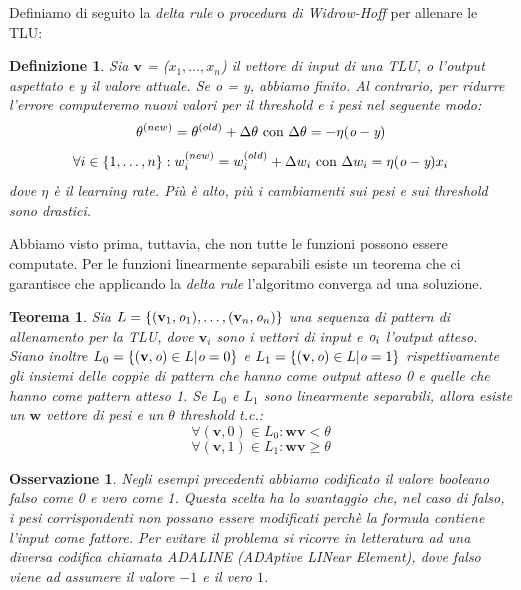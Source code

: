 \documentclass[10pt,a4paper]{article}
\newtheorem{remark}{Osservazione}
\newtheorem{definition}{Definizione}
\newtheorem{theorem}{Teorema}
\newcommand{\ww}{\mathbf{w}}
\newcommand{\vv}{\mathbf{v}}
\begin{document}
Definiamo di seguito la \emph{delta rule} o \emph{procedura di Widrow-Hoff} per allenare le TLU:

\begin{definition}
Sia $\vv$ = ($x_1, \dots, x_n$) il vettore di input di una TLU, \emph{o} l'output aspettato e \emph{y} il valore attuale. Se \emph{o} = \emph{y}, abbiamo finito. Al contrario, per ridurre l'errore computeremo nuovi valori per il threshold e i pesi nel seguente modo:
$$
\theta^{(new)} = \theta^{(old)} + \Delta\theta \text{ con } \Delta\theta = -\eta(\emph{o} - \emph{y})
$$
$$
\forall i \in \{1, \dots, n\}:w_i^{(new)} = w_i^{(old)} + \Delta w_i \text{ con } \Delta w_i = \eta(\emph{o} - \emph{y})x_i
$$
dove $\eta$ è il \emph{learning rate}. Più è alto, più i cambiamenti sui pesi e sui threshold sono drastici.

\end{definition}

Abbiamo visto prima, tuttavia, che non tutte le funzioni possono essere computate. Per le funzioni linearmente separabili esiste un teorema che ci garantisce che applicando la \emph{delta rule} l'algoritmo converga ad una soluzione.

\begin{theorem}
Sia $L = \{(\vv_1,\emph{o}_1), \dots, (\vv_n,\emph{o}_n)\}$ una sequenza di pattern di allenamento per la TLU, dove $\vv_i$ sono i vettori di input e $\emph{o}_i$ l'output atteso. 
Siano inoltre $L_0 = \{(\vv,\emph{o}) \in L | \emph{o} = 0\}$ e $L_1 = \{(\vv,\emph{o}) \in L | \emph{o} = 1\}$ rispettivamente gli insiemi delle coppie di pattern che hanno come output atteso 0 e quelle che hanno come pattern atteso 1. Se $L_0$ e $L_1$ sono linearmente separabili, allora esiste un $\ww$ vettore di pesi e un $\theta$ threshold t.c.:
$$
\forall (\vv,0) \in L_0: \ww\vv < \theta 
$$
$$
\forall (\vv,1) \in L_1: \ww\vv \geq \theta
$$
\end{theorem}

\begin{remark}
Negli esempi precedenti abbiamo codificato il valore booleano \emph{falso} come 0 e \emph{vero} come 1. Questa scelta ha lo svantaggio che, nel caso di \emph{falso}, i pesi corrispondenti non possano essere modificati perchè la formula contiene l'input come fattore. Per evitare il problema si ricorre in letteratura ad una diversa codifica chiamata \emph{ADALINE} (ADAptive LINear Element), dove \emph{falso} viene ad assumere il valore $-1$ e il \emph{vero} $1$.
\end{remark}
\end{document}

